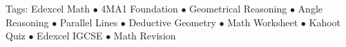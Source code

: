 \documentclass[11pt,a4paper]{article}
\begin{document}
\vspace{14pt}
\begin{center}
  \sffamily\scriptsize\textcolor{textmuted}{
    Tags: Edexcel Math $\bullet$ 4MA1 Foundation $\bullet$ Geometrical Reasoning $\bullet$ Angle Reasoning $\bullet$ Parallel Lines $\bullet$ Deductive Geometry $\bullet$ Math Worksheet $\bullet$ Kahoot Quiz $\bullet$ Edexcel IGCSE $\bullet$ Math Revision
  }
\end{center}
\end{document}
